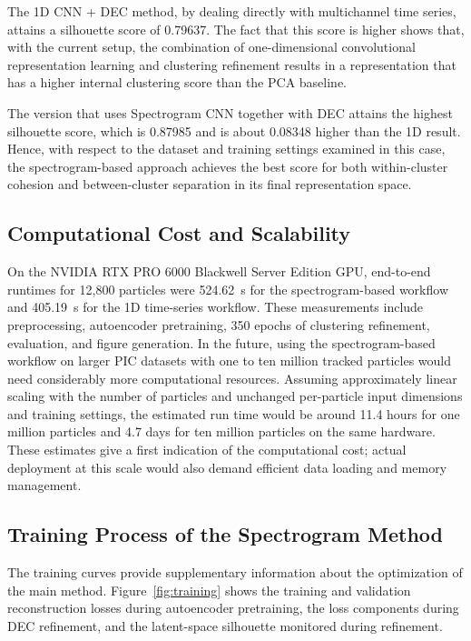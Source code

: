 The 1D CNN + DEC method, by dealing directly with multichannel time series, attains a silhouette score of 0.79637. The fact that this score is higher shows that, with the current setup, the combination of one-dimensional convolutional representation learning and clustering refinement results in a representation that has a higher internal clustering score than the PCA baseline.

The version that uses Spectrogram CNN together with DEC attains the highest silhouette score, which is 0.87985 and is about 0.08348 higher than the 1D result. Hence, with respect to the dataset and training settings examined in this case, the spectrogram-based approach achieves the best score for both within-cluster cohesion and between-cluster separation in its final representation space.

\subsection{Computational Cost and Scalability}

On the NVIDIA RTX PRO 6000 Blackwell Server Edition GPU, end-to-end runtimes for 12,800 particles were 524.62~s for the spectrogram-based workflow and 405.19~s for the 1D time-series workflow. These measurements include preprocessing, autoencoder pretraining, 350 epochs of clustering refinement, evaluation, and figure generation. In the future, using the spectrogram-based workflow on larger PIC datasets with one to ten million tracked particles would need considerably more computational resources. Assuming approximately linear scaling with the number of particles and unchanged per-particle input dimensions and training settings, the estimated run time would be around 11.4 hours for one million particles and 4.7 days for ten million particles on the same hardware. These estimates give a first indication of the computational cost; actual deployment at this scale would also demand efficient data loading and memory management.

\subsection{Training Process of the Spectrogram Method}

The training curves provide supplementary information about the optimization of the main method. Figure~\ref{fig:training} shows the training and validation reconstruction losses during autoencoder pretraining, the loss components during DEC refinement, and the latent-space silhouette monitored during refinement.

